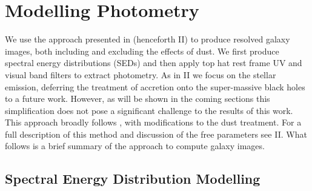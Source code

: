 \section{Modelling Photometry}
\label{sec:photo}

We use the approach presented in \cite{Vijayan2020} (henceforth \flares\-II) to produce resolved galaxy images, both including and excluding the effects of dust. We first produce spectral energy distributions (SEDs) and then apply top hat rest frame UV and visual band filters to extract photometry. As in \flares\-II we focus on the stellar emission, deferring the treatment of accretion onto the super-massive black holes to a future work. However, as will be shown in the coming sections this simplification does not pose a significant challenge to the results of this work. This approach broadly follows \cite{Wilkins2016a,Wilkins2017,Wilkins2018,Wilkins2020}, with modifications to the dust treatment. For a full description of this method and discussion of the free parameters see \flares\-II. What follows is a brief summary of the approach to compute galaxy images. 

\subsection{Spectral Energy Distribution Modelling}

